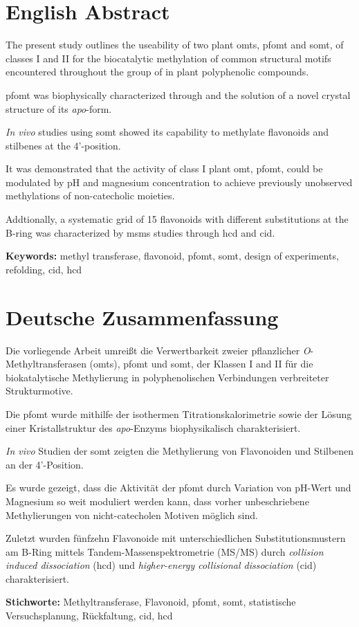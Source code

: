 \documentclass[10pt,a4paper]{article}
\newcommand{\pfomt}{\gls{pfomt}\xspace}
\newcommand{\somt}{\gls{somt}\xspace}
\begin{document}
 \section*{English Abstract} 

The present study outlines the useability of two plant \glspl{omt}, \pfomt and \somt, of classes I and II for the biocatalytic methylation of common structural motifs encountered throughout the group of in plant polyphenolic compounds.

\pfomt was biophysically characterized through  and the solution of a novel crystal structure of its \textit{apo}-form.

 
  \textit{In vivo} studies using \somt showed its capability to methylate flavonoids and stilbenes at the 4'-position. 
 
  It was demonstrated that the activity of class I plant \gls{omt}, \pfomt, could be modulated by pH and magnesium concentration to achieve previously unobserved methylations of non-catecholic moieties. 
 
  Addtionally, a systematic grid of 15 flavonoids with different substitutions at the B-ring was characterized by \gls{msms} studies through \gls{hcd} and \gls{cid}.
  
  \vfill
  \flushleft
  
  \textbf{Keywords:} methyl transferase, flavonoid, \gls{pfomt}, \gls{somt}, design of experiments, refolding, \gls{cid}, \gls{hcd}

\clearpage

\section*{Deutsche Zusammenfassung}

 Die vorliegende Arbeit umreißt die Verwertbarkeit zweier pflanzlicher \textit{O}-Methyl\-trans\-fer\-asen (\glspl{omt}), \pfomt und \somt, der Klassen I and II für die biokatalytische Methylierung in polyphenolischen Verbindungen verbreiteter Strukturmotive. 
 
 Die \pfomt wurde mithilfe der isothermen Titrationskalorimetrie sowie der Lösung einer Kristallstruktur des \textit{apo}-Enzyms biophysikalisch charakterisiert. 
 
 \textit{In vivo} Studien der \somt zeigten die Methylierung von Flavonoiden und Stilbenen an der 4'-Position. 
 
  Es wurde gezeigt, dass die Aktivität der \pfomt durch Variation von pH-Wert und Magnesium so weit moduliert werden kann, dass vorher unbeschriebene Methylierungen von nicht-catecholen Motiven möglich sind. 
 
 Zuletzt wurden fünfzehn Flavonoide mit unterschiedlichen Substitutionsmustern am B-Ring mittels Tandem-Massen\-spek\-tro\-metrie (MS/MS) durch \textit{collision induced dissociation} (\gls{hcd}) und \textit{higher-energy collisional dissociation} (\gls{cid}) charakterisiert.   

  \vfill
  \flushleft
  
  \textbf{Stichworte:} Methyltransferase, Flavonoid, \gls{pfomt}, \gls{somt}, statistische Versuchsplanung, Rückfaltung, \gls{cid}, \gls{hcd}
\end{document}
